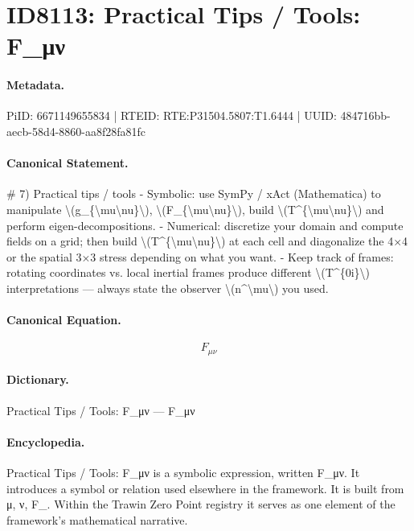 \section*{ID8113: Practical Tips / Tools: F\_μν}
\paragraph{Metadata.}
PiID: 6671149655834 | RTEID: RTE:P31504.5807:T1.6444 | UUID: 484716bb-aecb-58d4-8860-aa8f28fa81fc

\paragraph{Canonical Statement.}
\# 7) Practical tips / tools - Symbolic: use SymPy / xAct (Mathematica) to manipulate \textbackslash{}(g\_\{\textbackslash{}mu\textbackslash{}nu\}\textbackslash{}), \textbackslash{}(F\_\{\textbackslash{}mu\textbackslash{}nu\}\textbackslash{}), build \textbackslash{}(T\textasciicircum{}\{\textbackslash{}mu\textbackslash{}nu\}\textbackslash{}) and perform eigen-decompositions. - Numerical: discretize your domain and compute fields on a grid; then build \textbackslash{}(T\textasciicircum{}\{\textbackslash{}mu\textbackslash{}nu\}\textbackslash{}) at each cell and diagonalize the 4×4 or the spatial 3×3 stress depending on what you want. - Keep track of frames: rotating coordinates vs. local inertial frames produce different \textbackslash{}(T\textasciicircum{}\{0i\}\textbackslash{}) interpretations — always state the observer \textbackslash{}(n\textasciicircum{}\textbackslash{}mu\textbackslash{}) you used.

\paragraph{Canonical Equation.}
\[
F_{\mu\nu}
\]

\paragraph{Dictionary.}
Practical Tips / Tools: F\_μν — F\_μν

\paragraph{Encyclopedia.}
Practical Tips / Tools: F\_μν is a symbolic expression, written F\_μν. It introduces a symbol or relation used elsewhere in the framework. It is built from μ, ν, F\_. Within the Trawin Zero Point registry it serves as one element of the framework's mathematical narrative.
